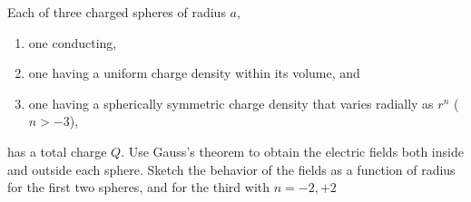 \begin{question}

  Each of three charged spheres of radius $a$,

  \begin{enumerate}[label=\alph*]

  \item one conducting,

  \item one having a uniform charge density within its volume, and

  \item one having a spherically symmetric charge density that varies
    radially as $r^n$ ($n > -3$),

  \end{enumerate}
  has a total charge $Q$. Use Gauss's theorem to obtain the electric
  fields both inside and outside each sphere. Sketch the behavior of
  the fields as a function of radius for the first two spheres, and
  for the third with $n = -2, +2$

\end{question}
